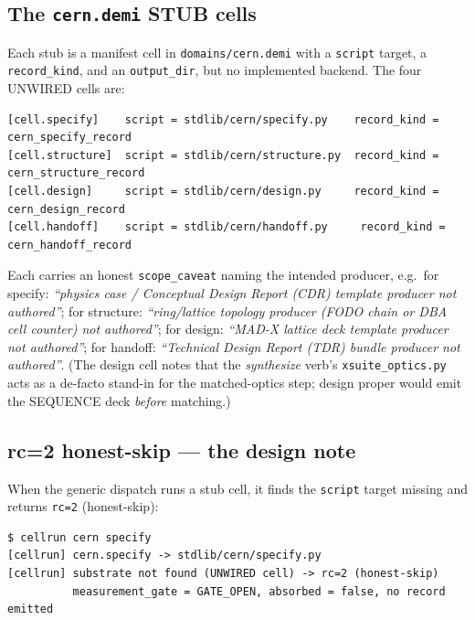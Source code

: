 \subsection{The \texttt{cern.demi} STUB cells}
\label{app:stubs-cell}

Each stub is a manifest cell in \verb|domains/cern.demi| with a
\verb|script| target, a \verb|record_kind|, and an \verb|output_dir|, but
no implemented backend. The four UNWIRED cells are:

\begin{lstlisting}
[cell.specify]    script = stdlib/cern/specify.py    record_kind = cern_specify_record
[cell.structure]  script = stdlib/cern/structure.py  record_kind = cern_structure_record
[cell.design]     script = stdlib/cern/design.py     record_kind = cern_design_record
[cell.handoff]    script = stdlib/cern/handoff.py     record_kind = cern_handoff_record
\end{lstlisting}

Each carries an honest \verb|scope_caveat| naming the intended producer,
e.g.\ for specify: \emph{``physics case / Conceptual Design Report (CDR)
template producer not authored''}; for structure: \emph{``ring/lattice
topology producer (FODO chain or DBA cell counter) not authored''}; for
design: \emph{``MAD-X lattice deck template producer not authored''}; for
handoff: \emph{``Technical Design Report (TDR) bundle producer not
authored''}. (The design cell notes that the \emph{synthesize} verb's
\texttt{xsuite\_optics.py} acts as a de-facto stand-in for the
matched-optics step; design proper would emit the SEQUENCE deck
\emph{before} matching.)

\subsection{rc=2 honest-skip --- the design note}
\label{app:stubs-rc2}

When the generic dispatch runs a stub cell, it finds the
\verb|script| target missing and returns \texttt{rc=2} (honest-skip):

\begin{lstlisting}
$ cellrun cern specify
[cellrun] cern.specify -> stdlib/cern/specify.py
[cellrun] substrate not found (UNWIRED cell) -> rc=2 (honest-skip)
          measurement_gate = GATE_OPEN, absorbed = false, no record emitted
\end{lstlisting}

